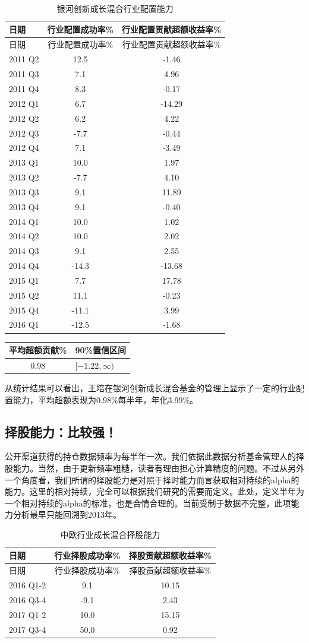 \documentclass[hyperref,]{ctexart}
\begin{document}
\begin{longtable}[]{@{}lcc@{}}
\caption{银河创新成长混合行业配置能力}\tabularnewline
\toprule
日期 & 行业配置成功率\% & 行业配置贡献超额收益率\%\tabularnewline
\midrule
\endfirsthead
\toprule
日期 & 行业配置成功率\% & 行业配置贡献超额收益率\%\tabularnewline
\midrule
\endhead
2011 Q2 & 12.5 & -1.46\tabularnewline
2011 Q3 & 7.1 & 4.96\tabularnewline
2011 Q4 & 8.3 & -0.17\tabularnewline
2012 Q1 & 6.7 & -14.29\tabularnewline
2012 Q2 & 6.2 & 4.22\tabularnewline
2012 Q3 & -7.7 & -0.44\tabularnewline
2012 Q4 & 7.1 & -3.49\tabularnewline
2013 Q1 & 10.0 & 1.97\tabularnewline
2013 Q2 & -7.7 & 4.10\tabularnewline
2013 Q3 & 9.1 & 11.89\tabularnewline
2013 Q4 & 9.1 & -0.40\tabularnewline
2014 Q1 & 10.0 & 1.02\tabularnewline
2014 Q2 & 10.0 & 2.02\tabularnewline
2014 Q3 & 9.1 & 2.55\tabularnewline
2014 Q4 & -14.3 & -13.68\tabularnewline
2015 Q1 & 7.7 & 17.78\tabularnewline
2015 Q2 & 11.1 & -0.23\tabularnewline
2015 Q4 & -11.1 & 3.99\tabularnewline
2016 Q1 & -12.5 & -1.68\tabularnewline
\bottomrule
\end{longtable}

\begin{longtable}[]{@{}cl@{}}
\toprule
平均超额贡献\% & 90\%置信区间\tabularnewline
\midrule
\endhead
0.98 & \([-1.22,\infty)\)\tabularnewline
\bottomrule
\end{longtable}

从统计结果可以看出，王培在银河创新成长混合基金的管理上显示了一定的行业配置能力，平均超额表现为0.98\%每半年，年化3.99\%。

\subsection{择股能力：比较强！}

公开渠道获得的持仓数据频率为每半年一次。我们依据此数据分析基金管理人的择股能力。当然，由于更新频率粗糙，读者有理由担心计算精度的问题。不过从另外一个角度看，我们所谓的择股能力是对照于择时能力而言获取相对持续的alpha的能力。这里的相对持续，完全可以根据我们研究的需要而定义。此处，定义半年为一个相对持续的alpha的标准，也是合情合理的。当前受制于数据不完整，此项能力分析最早只能回溯到2013年。

\begin{longtable}[]{@{}lcc@{}}
\caption{中欧行业成长混合择股能力}\tabularnewline
\toprule
日期 & 行业择股成功率\% & 择股贡献超额收益率\%\tabularnewline
\midrule
\endfirsthead
\toprule
日期 & 行业择股成功率\% & 择股贡献超额收益率\%\tabularnewline
\midrule
\endhead
2016 Q1-2 & 9.1 & 10.15\tabularnewline
2016 Q3-4 & -9.1 & 2.43\tabularnewline
2017 Q1-2 & 10.0 & 15.15\tabularnewline
2017 Q3-4 & 50.0 & 0.92\tabularnewline
\bottomrule
\end{longtable}
\end{document}
